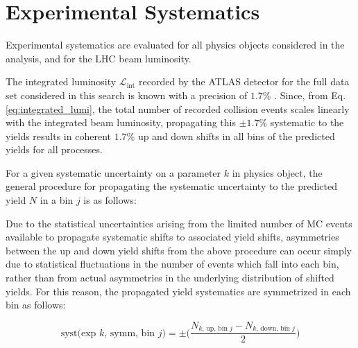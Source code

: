 \section{Experimental Systematics}

Experimental systematics are evaluated for all physics objects considered in the analysis, and for the LHC beam luminosity. 

The integrated luminosity \(\mathcal{L}_\text{int}\) recorded by the ATLAS detector for the full data set considered in this search is known with a precision of \(1.7\%\) \cite{ATLAS-CONF-2019-021}. Since, from Eq. \ref{eq:integrated_lumi}, the total number of recorded collision events scales linearly with the integrated beam luminosity, propagating this \(\pm1.7\%\) systematic to the yields results in coherent \(1.7\%\) up and down shifts in all bins of the predicted yields for all processes.

For a given systematic uncertainty on a parameter \(k\) in physics object, the general procedure for propagating the systematic uncertainty to the predicted yield \(N\) in a bin \(j\) is as follows:


\noindent Due to the statistical uncertainties arising from the limited number of MC events available to propagate systematic shifts to associated yield shifts, asymmetries between the up and down yield shifts from the above procedure can occur simply due to statistical fluctuations in the number of events which fall into each bin, rather than from actual asymmetries in the underlying distribution of shifted yields. For this reason, the propagated yield systematics are symmetrized in each bin as follows:

\begin{equation}
\label{eq:exp_systs_symm}
\text{syst}\text{(exp \(k\), symm, bin \(j\))}= \pm\Bigg(\frac{N_\text{\(k\), up, bin \(j\)} - N_\text{\(k\), down, bin \(j\)}}{2}\Bigg)
\end{equation}

